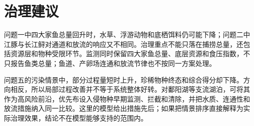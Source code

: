 \section{治理建议}
问题一中四大家鱼总量回升时，水草、浮游动物和底栖饵料仍可能下降；问题二中江豚与长江鲟对通道和放流的响应又不相同。治理重点不能只落在捕捞总量，还包括资源层和物种受限环节。监测同时保留四大家鱼总量、底层资源和食压指数，不只报告鱼类总量；鱼道、产卵场连通和放流节律也不按同一方案处理。

问题五的污染情景中，部分过程量短时上升，珍稀物种终态和综合得分却下降。方向相反，所以局部过程改善并不等于系统整体好转。对鄱阳湖等支流湖泊，可将其作为高风险前沿，优先布设入侵物种早期监测、拦截和清除，并把水质、连通性和放流措施纳入同一比较。这里的模型给出措施先后；如果把情景排序直接解释为实际治理效果，结论不在模型能够支持的范围内。

